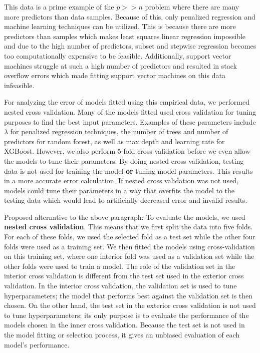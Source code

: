 \documentclass{article}
\begin{document}
This data is a prime example of the $p>>n$ problem where there are many more predictors than data samples. Because of this, only penalized regression and machine learning techniques can be utilized. This is because there are more predictors than samples which makes least squares linear regression impossible and due to the high number of predictors, subset and stepwise regression becomes too computationally expensive to be feasible. Additionally, support vector machines struggle at such a high number of predictors and resulted in stack overflow errors which made fitting support vector machines on this data infeasible.

For analyzing the error of models fitted using this empirical data, we performed nested cross validation. Many of the models fitted used cross validation for tuning purposes to find the best input parameters. Examples of these parameters include $\lambda$ for penalized regression techniques, the number of trees and number of predictors for random forest, as well as max depth and learning rate for XGBoost. However, we also perform 5-fold cross validation before we even allow the models to tune their parameters. By doing nested cross validation, testing data is not used for training the model \textbf{or} tuning model parameters. This results in a more accurate error calculation. If nested cross validation was not used, models could tune their parameters in a way that overfits the model to the testing data which would lead to artificially decreased error and invalid results.

Proposed alternative to the above paragraph: To evaluate the models, we used \textbf{nested cross validation}. This means that we first split the data into five folds. For each of these folds, we used the selected fold as a test set while the other four folds were used as a training set. We then fitted the models using cross-validation on this training set, where one interior fold was used as a validation set while the other folds were used to train a model. The role of the validation set in the interior cross validation is different from the test set used in the exterior cross validation. In the interior cross validation, the validation set is used to tune hyperparameters; the model that performs best against the validation set is then chosen. On the other hand, the test set in the exterior cross validation is not used to tune hyperparameters; its only purpose is to evaluate the performance of the models chosen in the inner cross validation. Because the test set is not used in the model fitting or selection process, it gives an unbiased evaluation of each model's performance.
\end{document}
